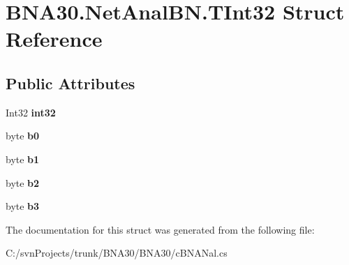\hypertarget{struct_b_n_a30_1_1_net_anal_b_n_1_1_t_int32}{}\section{B\+N\+A30.\+Net\+Anal\+B\+N.\+T\+Int32 Struct Reference}
\label{struct_b_n_a30_1_1_net_anal_b_n_1_1_t_int32}
\subsection*{Public Attributes}
\begin{DoxyCompactItemize}
\item 
\mbox{\label{struct_b_n_a30_1_1_net_anal_b_n_1_1_t_int32_a8c2f900d3813e42ba617a663156c375b}} 
Int32 {\bfseries int32}
\item 
\mbox{\label{struct_b_n_a30_1_1_net_anal_b_n_1_1_t_int32_af1de79a59d5ecac243cac4f9dfa303bb}} 
byte {\bfseries b0}
\item 
\mbox{\label{struct_b_n_a30_1_1_net_anal_b_n_1_1_t_int32_a64a0d933402905206f12b1e003e164b1}} 
byte {\bfseries b1}
\item 
\mbox{\label{struct_b_n_a30_1_1_net_anal_b_n_1_1_t_int32_a9fef9a010f6c37459030a294625a946b}} 
byte {\bfseries b2}
\item 
\mbox{\label{struct_b_n_a30_1_1_net_anal_b_n_1_1_t_int32_aa4820c32993de25560459e4f56c781f7}} 
byte {\bfseries b3}
\end{DoxyCompactItemize}


The documentation for this struct was generated from the following file\+:\begin{DoxyCompactItemize}
\item 
C\+:/svn\+Projects/trunk/\+B\+N\+A30/\+B\+N\+A30/c\+B\+N\+A\+Nal.\+cs\end{DoxyCompactItemize}
